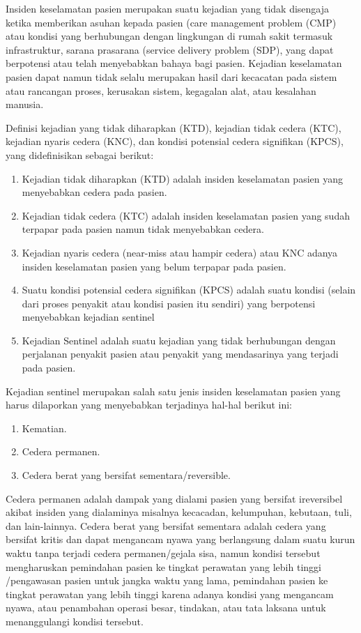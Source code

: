 \documentclass[
]{book}
\providecommand{\tightlist}{%
  \setlength{\itemsep}{0pt}\setlength{\parskip}{0pt}}
\begin{document}
Insiden keselamatan pasien merupakan suatu kejadian yang tidak disengaja ketika memberikan asuhan kepada pasien (care management problem (CMP) atau kondisi yang berhubungan dengan lingkungan di rumah sakit termasuk infrastruktur, sarana prasarana (service delivery problem (SDP), yang dapat berpotensi atau telah menyebabkan bahaya bagi pasien.
Kejadian keselamatan pasien dapat namun tidak selalu merupakan hasil dari kecacatan pada sistem atau rancangan proses, kerusakan sistem, kegagalan alat, atau kesalahan manusia.

Definisi kejadian yang tidak diharapkan (KTD), kejadian tidak cedera (KTC), kejadian nyaris cedera (KNC), dan kondisi potensial cedera signifikan (KPCS), yang didefinisikan sebagai berikut:

\begin{enumerate}
\def\labelenumi{\alph{enumi}.}
\tightlist
\item
  Kejadian tidak diharapkan (KTD) adalah insiden keselamatan pasien yang menyebabkan cedera pada pasien.
\item
  Kejadian tidak cedera (KTC) adalah insiden keselamatan pasien yang sudah terpapar pada pasien namun tidak menyebabkan cedera.
\item
  Kejadian nyaris cedera (near-miss atau hampir cedera) atau KNC adanya insiden keselamatan pasien yang belum terpapar pada pasien.
\item
  Suatu kondisi potensial cedera signifikan (KPCS) adalah suatu kondisi (selain dari proses penyakit atau kondisi pasien itu sendiri) yang berpotensi menyebabkan kejadian sentinel
\item
  Kejadian Sentinel adalah suatu kejadian yang tidak berhubungan dengan perjalanan penyakit pasien atau penyakit yang mendasarinya yang terjadi pada pasien.
\end{enumerate}

Kejadian sentinel merupakan salah satu jenis insiden keselamatan pasien yang harus dilaporkan yang menyebabkan terjadinya hal-hal berikut ini:

\begin{enumerate}
\def\labelenumi{\alph{enumi}.}
\tightlist
\item
  Kematian.
\item
  Cedera permanen.
\item
  Cedera berat yang bersifat sementara/reversible.
\end{enumerate}

Cedera permanen adalah dampak yang dialami pasien yang bersifat ireversibel akibat insiden yang dialaminya misalnya kecacadan, kelumpuhan, kebutaan, tuli, dan lain-lainnya. Cedera berat yang bersifat sementara adalah cedera yang bersifat kritis dan dapat mengancam nyawa yang berlangsung dalam suatu kurun waktu tanpa terjadi cedera permanen/gejala sisa, namun kondisi tersebut mengharuskan pemindahan pasien ke tingkat perawatan yang lebih tinggi /pengawasan pasien untuk jangka waktu yang lama, pemindahan pasien ke tingkat perawatan yang lebih tinggi karena adanya kondisi yang mengancam nyawa, atau penambahan operasi besar, tindakan, atau tata laksana untuk menanggulangi kondisi tersebut.
\end{document}
